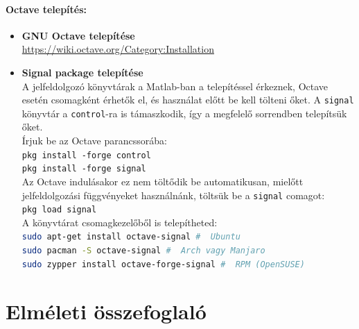 \documentclass[12pt,a4paper]{article}
\begin{document}
\paragraph{Octave telepítés:} 
\begin{itemize}
	\item \textbf{GNU Octave telepítése} \\\url{https://wiki.octave.org/Category:Installation}
	\item \textbf{Signal package telepítése} \\
	A jelfeldolgozó könyvtárak a Matlab-ban a telepítéssel érkeznek, Octave esetén csomagként érhetők el, és használat előtt be kell tölteni őket. A \texttt{signal} könyvtár a \texttt{control}-ra is támaszkodik, így a megfelelő sorrendben telepítsük őket.\\
	Írjuk be az Octave parancssorába: 	\\
	\texttt{pkg install -forge control}\\
	\texttt{pkg install -forge signal}\\
	Az Octave indulásakor ez nem töltődik be automatikusan, mielőtt jelfeldolgozási függvényeket használnánk, töltsük be a \texttt{signal} comagot: \\
	\texttt{pkg load signal}\\
	A könyvtárat csomagkezelőből is telepítheted: \\
	\lstinline[language=bash,basicstyle=\normalsize\ttfamily]{sudo apt-get install octave-signal #  Ubuntu} \\
	\lstinline[language=bash,basicstyle=\normalsize\ttfamily]{sudo pacman -S octave-signal #  Arch vagy Manjaro} \\
	\lstinline[language=bash,basicstyle=\normalsize\ttfamily]{sudo zypper install octave-forge-signal #  RPM (OpenSUSE)}
\end{itemize}


\section{Elméleti összefoglaló}
\end{document}
